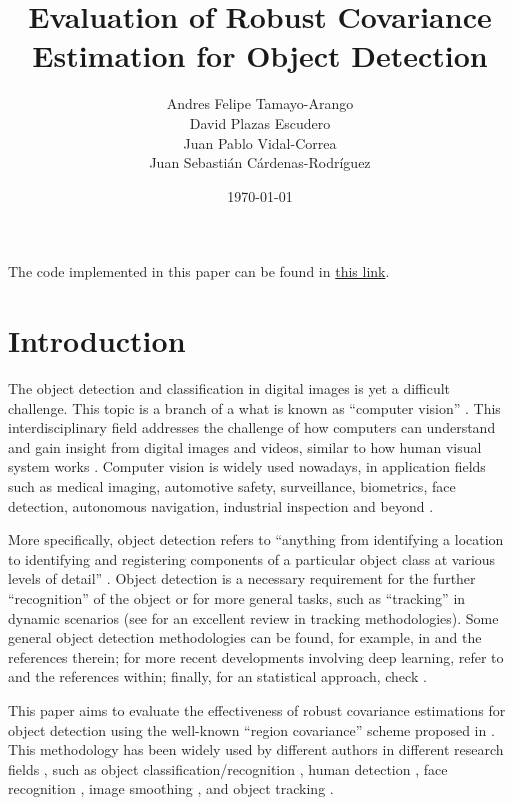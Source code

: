 \documentclass[11pt]{article}
\title{Evaluation of Robust Covariance Estimation for Object Detection}
\author{Andres Felipe Tamayo-Arango \\
  David Plazas Escudero \\
  Juan Pablo Vidal-Correa\\
  Juan Sebasti\'an C\'ardenas-Rodríguez \\
  \scalebox{0.7}{Mathematical Engineering, Universidad EAFIT}}
\date{\today}
\theoremstyle{definition}
\theoremstyle{remark}
\theoremstyle{remark}
\theoremstyle{remark}
\begin{document}
\maketitle

The code implemented in this paper can be found in \href{https://github.com/Daples/JuanSePlazas/tree/master/202/algebra-in-data-science/final-project}{this link}.

\section{Introduction}\label{sec_int}
The object detection and classification in digital images is yet a difficult challenge. This topic is a branch of a what is known as ``computer vision'' \parencite{amit20022d}. This interdisciplinary field addresses the challenge of how computers can understand and gain insight from digital images and videos, similar to how human visual system works \cite{ballard1982computer,huang1996computer,amit20022d,szeliski2010computer}. Computer vision is widely used nowadays, in application fields such as medical imaging, automotive safety, surveillance, biometrics, face detection, autonomous navigation, industrial inspection and beyond \cite{huang1996computer,szeliski2010computer}.

More specifically, object detection refers to ``anything from identifying a location to identifying and registering components of a particular object class at various levels of detail'' \parencite{amit20022d}. Object detection is a necessary requirement for the further ``recognition'' of the object or for more general tasks, such as ``tracking'' in dynamic scenarios (see \cite{li2013survey} for an excellent review in tracking methodologies). Some general object detection methodologies can be found, for example, in \cite{amit20022d,szeliski2010computer} and the references therein; for more recent developments involving deep learning, refer to \cite{jiang2018deep,zhao2019object} and the references within; finally, for an statistical approach, check \cite{li2015feature}.

This paper aims to evaluate the effectiveness of robust covariance estimations for object detection using the well-known ``region covariance'' scheme proposed in \parencite{tuzel2006}. This methodology has been widely used by different authors in different research fields \cite{wu2012real}, such as object classification/recognition \cite{hong2009sigma,sivalingam2010tensor,tosato2010multi}, human detection \cite{paisitkriangkrai2008fast,tuzel2007human,yao2007fast,hirzer2011person}, face recognition \cite{pang2008gabor,hariri20163d}, image smoothing \cite{karacan2013structure}, and object tracking \cite{porikli2006covariance,wu2008probabilistic,wu2009real,wu2009robust}.
\end{document}
